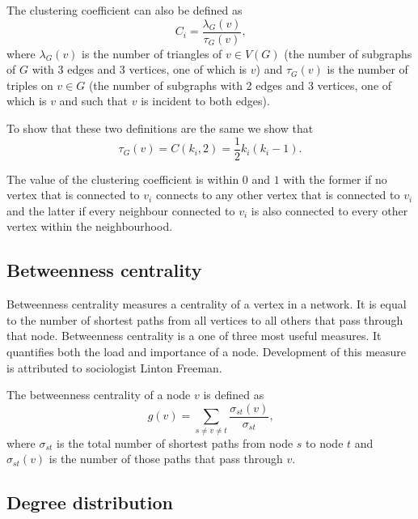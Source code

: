         The clustering coefficient can also be defined as
        \begin{equation}
          C_i = \frac{\lambda_G(v)}{\tau_G(v)} \mbox{,}
        \end{equation}
        where $\lambda_G(v)$ is the number of triangles of $v \in V(G)$ (the number of subgraphs of $G$ with 3 edges and 3 vertices, one of which is $v$) and $\tau_G(v)$ is the number of triples on $v \in G$ (the number of subgraphs with 2 edges and 3 vertices, one of which is $v$ and such that $v$ is incident to both edges).

        To show that these two definitions are the same we show that
        \begin{equation}
          \tau_G(v) = C({k_i},2) = \frac{1}{2}k_i(k_i-1) \mbox{.}
        \end{equation}

        The value of the clustering coefficient is within $0$ and $1$ with the former if no vertex that is connected to $v_i$ connects to any other vertex that is connected to $v_i$ and the latter if every neighbour connected to $v_i$ is also connected to every other vertex within the neighbourhood.

    \subsection{Betweenness centrality}

      Betweenness centrality measures a centrality of a vertex in a network. It is equal to the number of shortest paths from all vertices to all others that pass through that node. Betweenness centrality is a one of three most useful measures. It quantifies both the load and importance of a node. Development of this measure is attributed to sociologist Linton Freeman\cite{Freeman1977}.

      The betweenness centrality of a node $v$ is defined as
      \begin{equation}
        g(v) = \sum_{s \neq v \neq t} \frac{\sigma_{st}(v)}{\sigma_{st}} \mbox{,}
      \end{equation}
      where $\sigma_{st}$ is the total number of shortest paths from node $s$ to node $t$ and $\sigma_{st}(v)$ is the number of those paths that pass through $v$.

    \subsection{Degree distribution}

